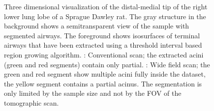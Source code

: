 \begin{figure}[htp]
{%
	}%
	\caption[3D visualization of the right lower lung lobe of a Sprague Dawley rat]{Three dimensional visualization of the distal-medial tip of the right lower lung lobe of a Sprague Dawley rat. The gray structure in the background shows a semitransparent view of the sample with segmented airways. The foreground shows isosurfaces of terminal airways that have been extracted using a threshold interval based region growing algorithm. : Conventional scan; the extracted acini (green and red segments) contain only partial. : Wide field scan; the green and red segment show multiple acini fully inside the dataset, the yellow segment contains a partial acinus. The segmentation is only limited by the sample size and not by the FOV of the tomographic scan.}%
	\label{fig:FOV increase overview}%
\end{figure}



